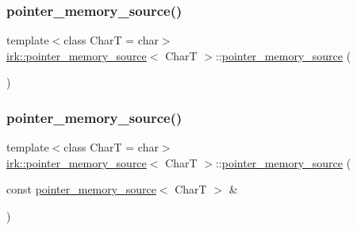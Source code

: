 \subsubsection{\texorpdfstring{pointer\+\_\+memory\+\_\+source()}{pointer\_memory\_source()}\hspace{0.1cm}{\footnotesize\ttfamily [1/4]}}
{\footnotesize\ttfamily template$<$class CharT  = char$>$ \\
\mbox{\hyperlink{classirk_1_1pointer__memory__source}{irk\+::pointer\+\_\+memory\+\_\+source}}$<$ CharT $>$\+::\mbox{\hyperlink{classirk_1_1pointer__memory__source}{pointer\+\_\+memory\+\_\+source}} (\begin{DoxyParamCaption}{ }\end{DoxyParamCaption})\hspace{0.3cm}{\ttfamily [default]}}

\mbox{\label{classirk_1_1pointer__memory__source_a8d511fd23cef776e3609534cffa9c872}} 
\subsubsection{\texorpdfstring{pointer\+\_\+memory\+\_\+source()}{pointer\_memory\_source()}\hspace{0.1cm}{\footnotesize\ttfamily [2/4]}}
{\footnotesize\ttfamily template$<$class CharT  = char$>$ \\
\mbox{\hyperlink{classirk_1_1pointer__memory__source}{irk\+::pointer\+\_\+memory\+\_\+source}}$<$ CharT $>$\+::\mbox{\hyperlink{classirk_1_1pointer__memory__source}{pointer\+\_\+memory\+\_\+source}} (\begin{DoxyParamCaption}\item[{const \mbox{\hyperlink{classirk_1_1pointer__memory__source}{pointer\+\_\+memory\+\_\+source}}$<$ CharT $>$ \&}]{ }\end{DoxyParamCaption})\hspace{0.3cm}{\ttfamily [default]}}

\mbox{\label{classirk_1_1pointer__memory__source_a72e864216e39308741c8d516a5575fe2}} 
